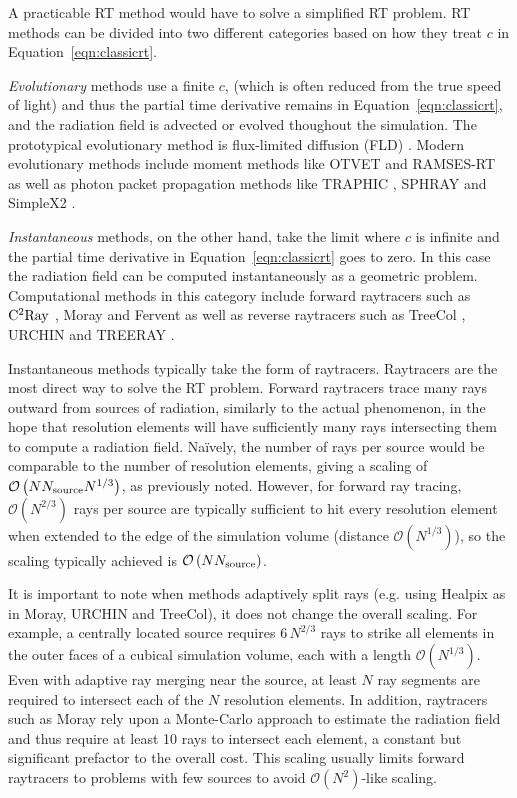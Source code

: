 \documentclass[fleq,usenatbib]{mnras}
\newcommand{\bigO}[1]{\mathcal{O}\left(#1\right)}
\newcommand{\NS}{N_{\rm source}}
\begin{document}
A practicable RT method would have to solve a simplified RT problem. RT 
methods can be divided into two different categories based on how they treat 
$c$ in Equation~\ref{eqn:classicrt}.

\textit{Evolutionary} methods use a 
finite $c$, (which is often reduced from the true speed of light) and thus the 
partial time derivative remains in Equation~\ref{eqn:classicrt}, and the 
radiation field is advected or evolved thoughout the simulation. The 
prototypical evolutionary method is flux-limited diffusion (FLD) 
\citep{levermorePomraning81}. Modern evolutionary methods include moment 
methods like OTVET \citep{gnedinAbel01} and RAMSES-RT \citep{rosdahlEt13} as 
well as photon packet propagation methods like TRAPHIC \citep{pawlikSchaye08}, 
SPHRAY \citep{altayEt08} and SimpleX2 \citep{paardekooperEt10}.

\textit{Instantaneous} methods, on the other hand, take the limit where $c$ 
is infinite and the partial time derivative in Equation~\ref{eqn:classicrt} 
goes to zero. In this case the radiation field can be computed instantaneously 
as a geometric problem. Computational methods in this category include forward 
raytracers such as $\rm C^2Ray$ \citep{mellemaEt06a}, Moray 
\citep{wiseAbel11} and Fervent \citep{baczynskiEt15} as well as reverse 
raytracers such as TreeCol \citep{clarkEt12}, URCHIN \citep{altayTheuns13} 
and TREERAY \citep{Wunsch2018, HaidEt18}. 

Instantaneous methods typically take the form of raytracers. Raytracers are 
the most direct way to solve the RT problem. Forward raytracers trace many 
rays outward from sources of radiation, similarly to the actual phenomenon, in 
the hope that resolution elements will have sufficiently many rays 
intersecting them to compute a radiation field. Na\"ively, the number of rays 
per source would be comparable to the number of resolution elements, giving a 
scaling of $\bigO{N \NS N^{1/3}}$, as previously noted. However, for forward 
ray tracing, $\bigO{N^{2/3}}$ rays per source are typically sufficient to hit 
every resolution element when extended to the edge of the simulation volume 
(distance $\bigO{N^{1/3}}$), so the scaling typically achieved is 
$\bigO{N \NS}$.  

It is important to note when methods adaptively split rays (e.g. using 
Healpix \citealt{gorskiEt05} as in Moray, URCHIN and TreeCol), it does not 
change the overall scaling. For example, a centrally located source requires 
$6\, N^{2/3}$ rays to strike all elements in the outer faces of a cubical 
simulation volume, each with a length $\bigO{N^{1/3}}$. Even with adaptive ray 
merging near the source, at least $N$ ray segments are required to intersect 
each of the $N$ resolution elements. In addition, raytracers such as Moray 
rely upon a Monte-Carlo approach to estimate the radiation field and thus 
require at least 10 rays to intersect each element, a constant but 
significant prefactor to the overall cost. This scaling usually limits 
forward raytracers to problems with few sources to avoid 
$\mathcal{O}(N^2)$-like scaling. 
\end{document}
